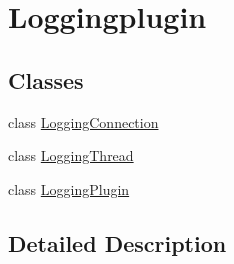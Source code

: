 \hypertarget{group__loggingplugin}{\section{Loggingplugin}
\label{group__loggingplugin}
}
\subsection*{Classes}
\begin{DoxyCompactItemize}
\item 
class \hyperlink{class_logging_connection}{Logging\-Connection}
\item 
class \hyperlink{class_logging_thread}{Logging\-Thread}
\item 
class \hyperlink{class_logging_plugin}{Logging\-Plugin}
\end{DoxyCompactItemize}


\subsection{Detailed Description}
